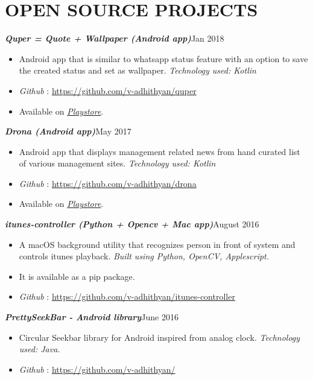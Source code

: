 \documentclass[11pt,a4paper]{article}
\begin{document}
\section*{OPEN SOURCE PROJECTS}
\emph{\textbf{Quper = Quote + Wallpaper (Android app)}}{\hfill Jan 2018}
\begin{itemize}[noitemsep]
\item Android app that is similar to whatsapp status feature with an option to save the created status and set as wallpaper. \emph{Technology used: Kotlin}
\item \emph{Github} : \href{https://github.com/v-adhithyan/quper}{https://github.com/v-adhithyan/quper}
\item Available on \href{https://play.google.com/store/apps/details?id=ceg.avtechlabs.quper}{\emph{Playstore}}.
\end{itemize}
\emph{\textbf{Drona (Android app)}}{\hfill May 2017}
\begin{itemize}[noitemsep]
\item Android app that displays management related news from hand curated list of various management sites. \emph{Technology used: Kotlin}
\item \emph{Github} : \href{https://github.com/v-adhithyan/drona}{https://github.com/v-adhithyan/drona}
\item Available on \href{https://play.google.com/store/apps/details?id=ceg.avtechlabs.mba}{\emph{Playstore}}.
\end{itemize}
\emph{\textbf{itunes-controller (Python + Opencv + Mac app)}}{\hfill August 2016}
\begin{itemize}[noitemsep]
\item A macOS background utility that recognizes person in front of system and controls itunes playback. \emph{Built using
Python, OpenCV, Applescript.}
\item It is available as a pip package.
\item \emph{Github} : \href{https://github.com/v-adhithyan/itunes-controller}{https://github.com/v-adhithyan/itunes-controller}
\end{itemize}
\emph{\textbf{PrettySeekBar - Android library}}{\hfill June 2016}
\begin{itemize}[noitemsep]
\item Circular Seekbar library for Android inspired from analog clock. \emph{Technology used: Java.}
\item \emph{Github} : \href{https://github.com/v-adhithyan/PrettySeekBar}{https://github.com/v-adhithyan/}
\end{itemize}
\end{document}
